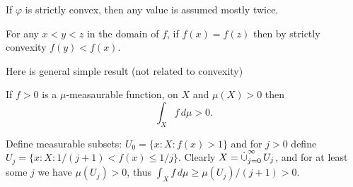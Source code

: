 \begin{llem}
If \(\varphi\) is strictly convex, then any value is assumed mostly twice.
\end{llem}
\begin{thmproof}
For any \(x<y<z\) in the domain of $f$, if \(f(x)=f(z)\)
then by strictly convexity \(f(y) < f(x)\).
\end{thmproof}

Here is general simple result (not related to convexity)
\begin{llem} \label{lem:fgz:igz}
If \(f>0\) is a \(\mu\)-measaurable function, on $X$ and \(\mu(X) > 0\)
then
\begin{equation*}
\int_X f\,d\mu > 0.
\end{equation*}
\end{llem}
\begin{thmproof}
Define measurable subsets: \(U_0 = \{x:X: f(x)>1\}\) and for \(j>0\) define
\(U_j = \{x:X: 1/(j+1) < f(x) \leq 1/j\}\).
Clearly \(X = \disjunion_{j=0}^\infty U_j\), and for at least some $j$
we have \(\mu(U_j) > 0\), thus \(\int_X f\,d\mu \geq \mu(U_j)/(j+1) > 0\).
\end{thmproof}

